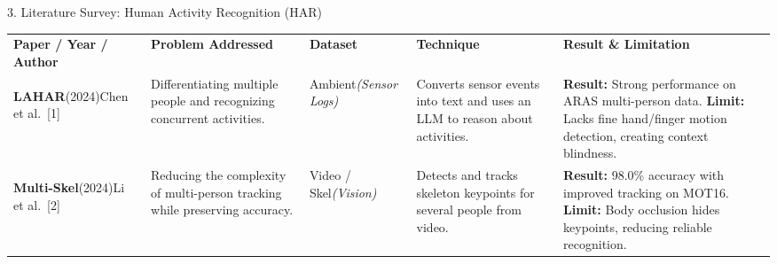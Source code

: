 \documentclass[aspectratio=169,11pt]{beamer}
\begin{document}
\begin{frame}[t]{3. Literature Survey: Human Activity Recognition (HAR)}

\vspace{-0.1cm} %
\centering
\fontsize{5.5}{6.5}\selectfont
\renewcommand{\arraystretch}{1.05} %
\setlength{\tabcolsep}{3pt}

\begin{tabular}{
>{\bfseries\RaggedRight\arraybackslash}m{}
>{\RaggedRight\arraybackslash}m{}
>{\RaggedRight\arraybackslash}m{}
>{\RaggedRight\arraybackslash}m{}
>{\RaggedRight\arraybackslash}m{} %
}

\rowcolor{AmritaMaroon}
{\color{white}\textbf{Paper / Year / Author}} &
{\color{white}\textbf{Problem Addressed}} &
{\color{white}\textbf{Dataset}} &
{\color{white}\textbf{Technique}} &
{\color{white}\textbf{Result \& Limitation}} \\

\arrayrulecolor{white}\hline

\rowcolor{LightBlue}
\textbf{LAHAR}\newline \textnormal{(2024)}\newline \textnormal{Chen et al.~[1]} &
Differentiating multiple people and recognizing concurrent activities. &
Ambient\newline\textit{(Sensor Logs)} &
Converts sensor events into text and uses an LLM to reason about activities. &
\textbf{Result:} Strong performance on ARAS multi-person data.\newline
\textbf{Limit:} Lacks fine hand/finger motion detection, creating context blindness. \\

\hline

\rowcolor{LightGreen}
\textbf{Multi-Skel}\newline \textnormal{(2024)}\newline \textnormal{Li et al.~[2]} &
Reducing the complexity of multi-person tracking while preserving accuracy. &
Video / Skel\newline\textit{(Vision)} &
Detects and tracks skeleton keypoints for several people from video. &
\textbf{Result:} 98.0\% accuracy with improved tracking on MOT16.\newline
\textbf{Limit:} Body occlusion hides keypoints, reducing reliable recognition. \\


\end{tabular}
\end{frame}
\end{document}
